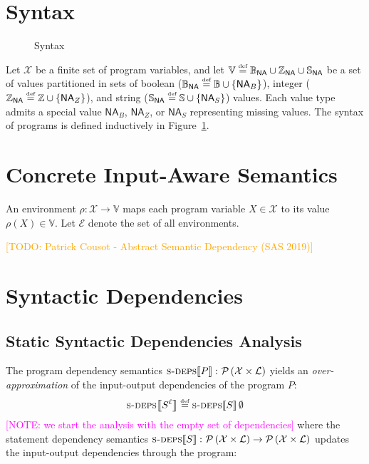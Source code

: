 \documentclass{article}
\newcommand{\defined}{\ensuremath{\stackrel{\mbox{\tiny def}}{=}}\xspace} %
\newcommand{\vars}{\ensuremath{\mathcal{X}}\xspace} %
\newcommand{\vals}{\ensuremath{\mathbb{V}}\xspace} %
\newcommand{\bvals}{\ensuremath{\mathbb{B}_\mathsf{NA}}\xspace} %
\newcommand{\bools}{\ensuremath{\mathbb{B}}\xspace} %
\newcommand{\bna}{\ensuremath{\mathsf{NA}_{B}}\xspace} %
\newcommand{\ivals}{\ensuremath{\mathbb{Z}_\mathsf{NA}}\xspace} %
\newcommand{\ints}{\ensuremath{\mathbb{Z}}\xspace} %
\newcommand{\ina}{\ensuremath{\mathsf{NA}_{Z}}\xspace} %
\newcommand{\svals}{\ensuremath{\mathbb{S}_\mathsf{NA}}\xspace} %
\newcommand{\strings}{\ensuremath{\mathbb{S}}\xspace} %
\newcommand{\sna}{\ensuremath{\mathsf{NA}_{S}}\xspace} %
\newcommand{\powerset}[1]{\ensuremath{\mathcal{P}\left(#1\right)}\xspace} %
\newcommand{\labels}{\ensuremath{\mathcal{L}}\xspace} %
\newcommand{\envs}{\ensuremath{\mathcal{E}}\xspace} %
\newcommand{\semantics}[1]{\ensuremath{\left\llbracket #1 \right\rrbracket}\xspace} %
\newcommand{\sdeps}[1]{\ensuremath{\textsc{s-deps}\!\semantics{#1}}\xspace} %
\newcommand{\irem}[3]{{\noindent\textcolor{#1}{\textsf{[#2: 
#3]}}}}
\newcommand{\todo}[1]{\irem{orange}{TODO}{#1}}
\newcommand{\note}[1]{\irem{magenta}{NOTE}{#1}}
\begin{document}
\section*{Syntax}

\begin{figure}[th]
  \begin{center}
    \grammartabularSTY{
    \ottv\ottinterrule
    \ottse\ottinterrule
    \otte\ottinterrule
    \otts\ottinterrule
    \ottP
    }
  \end{center}
  \vspace{-1em}
  \caption{Syntax}\label{fig:syntax}
\end{figure}

Let \vars be a finite set of program variables, and let $\vals\defined\bvals \cup \ivals \cup \svals$ be a set of values partitioned  in sets of boolean ($\bvals \defined \bools \cup \{\bna\} $), integer ($\ivals \defined \ints \cup \{\ina\} $), and string ($\svals \defined \strings \cup \{\sna\} $) values. Each value type admits a special value $\bna$, $\ina$, or $\sna$ representing missing values.
The syntax of programs is defined inductively in Figure~\ref{fig:syntax}.

\section*{Concrete Input-Aware Semantics}

An environment $\rho\colon \vars \rightarrow \vals$ maps each program variable $X \in \vars$ to its value $\rho(X) \in \vals$. Let \envs denote the set of all environments. 

\todo{Patrick Cousot - Abstract Semantic Dependency (SAS 2019)}


\section*{Syntactic Dependencies}

\subsection*{Static Syntactic Dependencies Analysis}

The program dependency semantics $\sdeps{P} \colon \powerset{\vars \times \labels}$ yields an \emph{over-approximation} of the input-output dependencies of the program $P$:
\begin{equation*}
\sdeps{S^\ell{}} \defined \sdeps{S}\emptyset
\end{equation*}
\note{we start the analysis with the empty set of dependencies}
where the statement dependency semantics $\sdeps{S} \colon \powerset{\vars \times \labels} \rightarrow  \powerset{\vars \times \labels}$ updates the input-output dependencies through the program:
\end{document}
